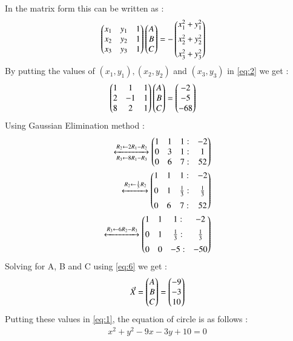 \documentclass[journal,12pt,twocolumn]{IEEEtran}
\begin{document}
In the matrix form this can be written as : 
\begin{align}
 \begin{pmatrix}x_1&y_1&1\\x_2&y_2&1\\x_3&y_3&1\end{pmatrix}\begin{pmatrix}A\\B\\C\end{pmatrix}&=-\begin{pmatrix}x_1^2+y_1^2\\[0.2cm]x_2^2+y_2^2\\[0.2cm]x_3^2+y_3^2\end{pmatrix} \label{eq:2} 
\end{align}
By putting the values of $(x_1,y_1),(x_2,y_2)$ and $(x_3,y_3)$ in \eqref{eq:2} we get :
\begin{align}
 \begin{pmatrix}1&1&1\\2&-1&1\\8&2&1\end{pmatrix}\begin{pmatrix}A\\B\\C\end{pmatrix}&=\begin{pmatrix}-2\\-5\\-68\end{pmatrix} \label{eq:3}    
\end{align}
Using Gaussian Elimination method :
\begin{align}
\xleftrightarrow[R_3 \leftarrow 8R_1-R_3]{R_2 \leftarrow 2R_1-R_2}\begin{pmatrix}1&1&1:&-2\\0&3&1:&1\\0&6&7:&52\end{pmatrix}\\
\xleftrightarrow{R_2 \leftarrow \frac{1}{3} R_2}\begin{pmatrix}1&1&1:&-2\\[0.2cm]0&1&\frac{1}{3}:&\frac{1}{3}\\[0.2cm]0&6&7:&52\end{pmatrix}\\
\xleftrightarrow{R_3 \leftarrow 6R_2-R_3}\begin{pmatrix}1&1&1:&-2\\[0.2cm]0&1&\frac{1}{3}:&\frac{1}{3}\\[0.2cm]0&0&-5:&-50\end{pmatrix}\label{eq:6}
\end{align}
Solving for A, B and C using \eqref{eq:6} we get : 
\begin{align}
\Vec{X}=\begin{pmatrix}A\\B\\C\end{pmatrix}=\begin{pmatrix}-9\\-3\\10\end{pmatrix}
\end{align}
Putting these values in \eqref{eq:1}, the equation of circle is as follows : 
\begin{align}
x^2+y^2-9x-3y+10=0\label{eq:8}   
\end{align}
\end{document}
